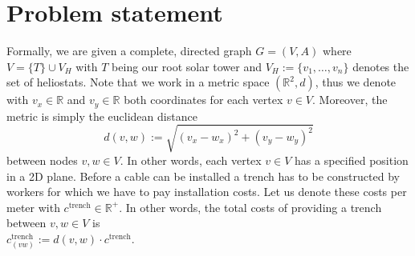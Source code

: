 \newcommand*{\trenchcost}{c^\text{trench}}
\newcommand*{\datacost}{c_d^\text{data}}
\newcommand*{\datatotalcost}{c_{d,(vw)}^\text{data}}
\newcommand*{\datalength}{L_d^\text{data}}
\newcommand*{\datacapacity}{M_d^\text{data}}
\newcommand*{\switchcosts}{c_{s}^\text{lcu}}

\newcommand*{\trenchtotalcost}{c_{(vw)}^\text{trench}}

\section{Problem statement}
Formally, we are given a complete, directed graph $G=(V,A)$ where $V=\{T\} \cup V_H$ with $T$ being our root solar tower and $V_H:=\{v_1,\ldots,v_{n}\}$ denotes the set of heliostats. Note that we work in a metric space $(\mathbb{R}^2,d)$, thus we denote with $v_x\in\mathbb{R}$ and $v_y \in\mathbb{R}$ both coordinates for each vertex $v\in V$. Moreover, the metric is simply the euclidean distance 
\begin{equation}
  d(v,w) := \sqrt{(v_x-w_x)^2 + (v_y-w_y)^2} \nonumber
\end{equation}
between nodes $v,w\in V$. In other words, each vertex $v\in V$ has a specified position in a 2D plane.
\emptyline
\noindent
Before a cable can be installed a trench has to be constructed by workers for which we have to pay installation costs. Let us denote these costs per meter with $\trenchcost\in\mathbb{R}^+$. In other words, the total costs of providing a trench between $v,w\in V$ is \\ 
$\trenchtotalcost := d(v,w)\cdot\trenchcost$.


